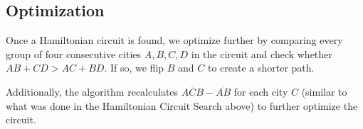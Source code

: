 \documentclass[letterpaper,12pt]{article}
\begin{document}

		\subsection{Optimization}
			Once a Hamiltonian circuit is found, we optimize further by
			comparing every group of four consecutive cities $A, B, C, D$ in
			the circuit and check whether $AB+CD > AC+BD$. If so, we flip $B$
			and $C$ to create a shorter path.

			Additionally, the algorithm recalculates $\overline{ACB}
			- \overline{AB}$ for each city $C$ (similar to what was done in the
			Hamiltonian Circuit Search above) to further optimize the circuit.

\end{document}

